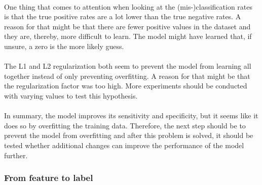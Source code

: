 \\
One thing that comes to attention when looking at the (mis-)classification rates is that the true positive rates are a lot lower than the true negative rates. A reason for that might be that there are fewer positive values in the dataset and they are, thereby, more difficult to learn. The model might have learned that, if unsure, a zero is the more likely guess. \\
\\
The L1 and L2 regularization both seem to prevent the model from learning all together instead of only preventing overfitting. A reason for that might be that the regularization factor was too high. More experiments should be conducted with varying values to test this hypothesis. \\
\\
In summary, the model improves its sensitivity and specificity, but it seems like it does so by overfitting the training data. Therefore, the next step should be to prevent the model from overfitting and after this problem is solved, it should be tested whether additional changes can improve the performance of the model further. \\

\subsubsection{From feature to label}

